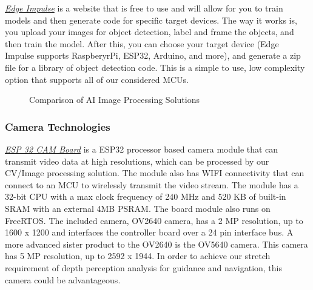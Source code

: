 \noindent \underline{\textit{Edge Impulse}} is a website that is free to use and will allow for you to train models and then generate code for specific target devices. The way it works is, you upload your images for object detection, label and frame the objects, and then train the model. After this, you can choose your target device (Edge Impulse supports RaspberyrPi, ESP32, Arduino, and more), and generate a zip file for a library of object detection code. This is a simple to use, low complexity option that supports all of our considered MCUs.\\

\begin{figure}[H]
	\centering
	\setlength{\tabcolsep}{5pt} %
	\renewcommand{\arraystretch}{1.75} %
	\caption{\label{fig:aiComparison}Comparison of AI Image Processing Solutions}
\end{figure}


\subsubsection{Camera Technologies}
\label{sec:cam_tech}
\noindent \underline{\textit{ESP 32 CAM Board}} is a ESP32 processor based camera module that can transmit video data at high resolutions, which can be processed by our CV/Image processing solution. The module also has WIFI connectivity that can connect to an MCU to wirelessly transmit the video stream. The module has a 32-bit CPU with a max clock frequency of 240 MHz and 520 KB of built-in SRAM with an external 4MB PSRAM. The board module also runs on FreeRTOS. The included camera, OV2640 camera, has a 2 MP resolution, up to 1600 x 1200 and interfaces the controller board over a 24 pin interface bus. A more advanced sister product to the OV2640 is the OV5640 camera. This camera has 5 MP resolution, up to 2592 x 1944. In order to achieve our stretch requirement of depth perception analysis for guidance and navigation, this camera could be advantageous.\\

